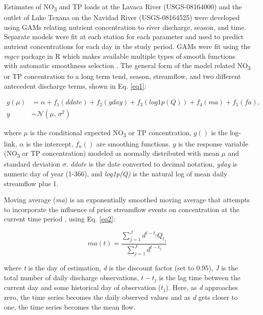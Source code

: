 \documentclass[fleqn,10pt,lineno]{wlpeerj} %
\begin{document}
Estimates of NO\textsubscript{3} and TP loads at the Lavaca River
(USGS-08164000) and the outlet of Lake Texana on the Navidad River
(USGS-08164525) were developed using GAMs relating nutrient
concentration to river discharge, season, and time. Separate models were
fit at each station for each parameter and used to predict nutrient
concentrations for each day in the study period. GAMs were fit using the
\emph{mgcv} package in R which makes available multiple types of smooth
functions with automatic smoothness selection
\autocite{woodFastStableRestricted2011}. The general form of the model
related NO\textsubscript{3} or TP concentration to a long term tend,
season, streamflow, and two different antecedent discharge terms, shown
in Eq. \ref{eq1}:

\begin{align}
g(\mu) &= \alpha + f_1(ddate) + f_2(yday) + f_3(log1p(Q)) + f_4(ma) + f_5(fa), \nonumber \\
y &\sim \mathcal{N}(\mu,\,\sigma^{2})
\label{eq1}
\end{align}

where \(\mu\) is the conditional expected NO\textsubscript{3} or TP
concentration, \(g()\) is the log-link, \(\alpha\) is the intercept,
\(f_n()\) are smoothing functions. \(y\) is the response variable
(NO\textsubscript{3} or TP concentration) modeled as normally
distributed with mean \(\mu\) and standard deviation \(\sigma\).
\emph{ddate} is the date converted to decimal notation, \emph{yday} is
numeric day of year (1-366), and \emph{log1p(Q)} is the natural log of
mean daily streamflow plus 1.

Moving average (\emph{ma}) is an exponentially smoothed moving average
that attempts to incorporate the influence of prior streamflow events on
concentration at the current time period
\autocite{wangLoadEstimationUncertainties2011,kuhnertQuantifyingTotalSuspended2012,zhang_improving_2017},
using Eq. \ref{eq2}:

\begin{equation}
ma(t) = \frac{\sum^{J}_{j=1}{d^{t-t_j}Q_{t_{j}}}}{\sum^{J}_{j=1}d^{t-t_j}}
\label{eq2}
\end{equation}

where \emph{t} is the day of estimation, \emph{d} is the discount factor
(set to 0.95), \emph{J} is the total number of daily discharge
observations, \(t-t_j\) is the lag time between the current day and some
historical day of observation (\(t_j\)). Here, as \emph{d} approaches
zero, the time series becomes the daily observed values and as \emph{d}
gets closer to one, the time series becomes the mean flow.
\end{document}
